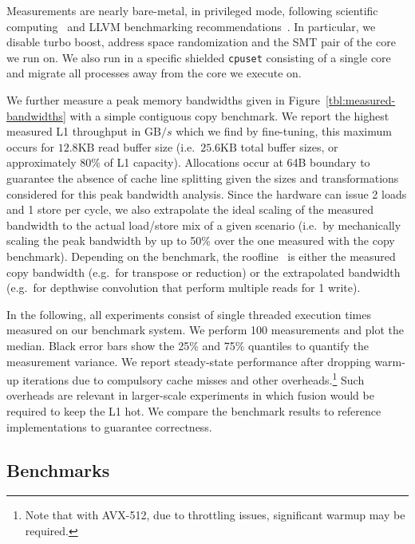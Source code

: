 Measurements are nearly bare-metal, in privileged mode, following scientific computing~\cite{benchmark2015} and LLVM benchmarking recommendations~\cite{LLVM_benchmarking}.
In particular, we disable turbo boost, address space randomization and the SMT pair of the core we run on.
We also run in a specific shielded \lstinline|cpuset| consisting of a single core and migrate all 
processes away from the core we execute on.

We further measure a peak memory bandwidths given in Figure~\ref{tbl:measured-bandwidths} with a simple contiguous copy benchmark.
We report the highest measured L1 throughput in $\mathrm{GB}/s$ which we find by fine-tuning, this maximum occurs for $12.8\mathrm{KB}$ read buffer size (i.e.\ $25.6\mathrm{KB}$ total buffer sizes, or approximately 80\% of L1 capacity).
Allocations occur at 64B boundary to guarantee the absence of cache line splitting given the sizes and transformations considered 
for this peak bandwidth analysis.
Since the hardware can issue 2 loads and 1 store per cycle, we also extrapolate the ideal scaling of the 
measured bandwidth to the actual load/store mix of a given scenario (i.e.\ by mechanically scaling the peak bandwidth by up to 50\% over the one measured with the copy benchmark).
Depending on the benchmark, the roofline~\cite{roofline} is either the measured copy bandwidth (e.g.\ for transpose or reduction) or the extrapolated bandwidth (e.g.\ for depthwise convolution that perform multiple reads for 1 write).
                            
In the following, all experiments consist of single threaded execution times measured on our benchmark system. 
We perform 100 measurements and plot the median. Black error bars show the 25\% and 75\% quantiles to quantify the measurement variance.
We report steady-state performance after dropping warm-up iterations due to compulsory cache misses and other overheads.\footnote{Note that with AVX-512, due to throttling issues, significant warmup may be required.}
Such overheads are relevant in larger-scale experiments in which fusion would be required to keep the L1 hot.
We compare the benchmark results to reference implementations to guarantee correctness.

\subsection{Benchmarks}


